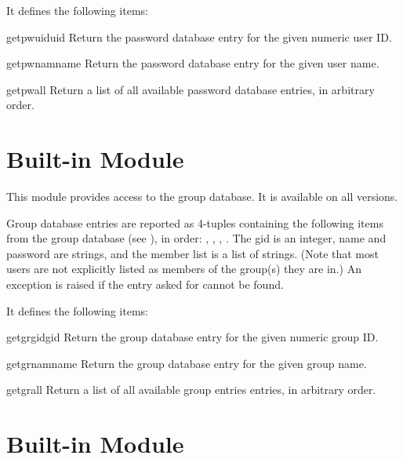 It defines the following items:

\renewcommand{\indexsubitem}{(in module pwd)}
\begin{funcdesc}{getpwuid}{uid}
Return the password database entry for the given numeric user ID.
\end{funcdesc}

\begin{funcdesc}{getpwnam}{name}
Return the password database entry for the given user name.
\end{funcdesc}

\begin{funcdesc}{getpwall}{}
Return a list of all available password database entries, in arbitrary order.
\end{funcdesc}

\section{Built-in Module }

This module provides access to the \UNIX{} group database.
It is available on all \UNIX{} versions.

Group database entries are reported as 4-tuples containing the
following items from the group database (see ), in order:
,
,
,
.
The gid is an integer, name and password are strings, and the member
list is a list of strings.
(Note that most users are not explicitly listed as members of the
group(s) they are in.)
An exception is raised if the entry asked for cannot be found.

It defines the following items:

\renewcommand{\indexsubitem}{(in module grp)}
\begin{funcdesc}{getgrgid}{gid}
Return the group database entry for the given numeric group ID.
\end{funcdesc}

\begin{funcdesc}{getgrnam}{name}
Return the group database entry for the given group name.
\end{funcdesc}

\begin{funcdesc}{getgrall}{}
Return a list of all available group entries entries, in arbitrary order.
\end{funcdesc}

\section{Built-in Module }

